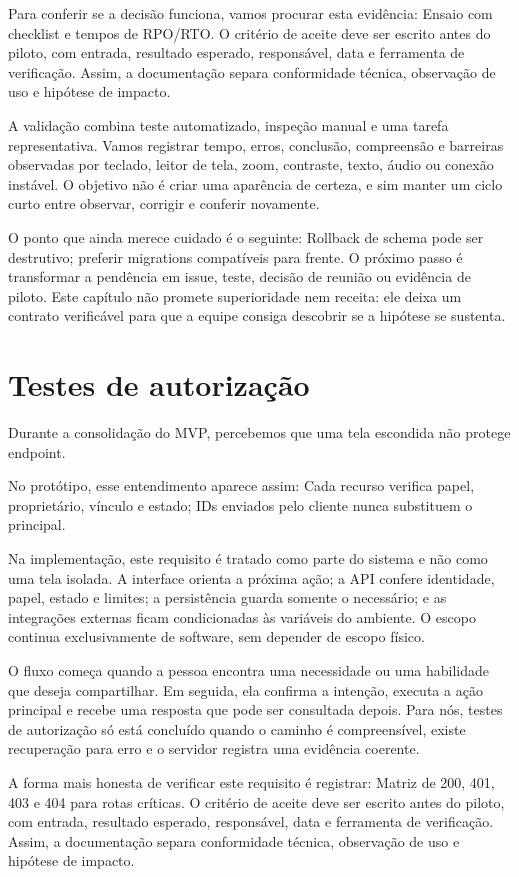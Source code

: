 \documentclass[12pt,oneside,a4paper,article]{abntex2}
\begin{document}
Para conferir se a decisão funciona, vamos procurar esta evidência: Ensaio com checklist e tempos de RPO/RTO. O critério de aceite deve ser escrito antes do piloto, com entrada, resultado esperado, responsável, data e ferramenta de verificação. Assim, a documentação separa conformidade técnica, observação de uso e hipótese de impacto.

A validação combina teste automatizado, inspeção manual e uma tarefa representativa. Vamos registrar tempo, erros, conclusão, compreensão e barreiras observadas por teclado, leitor de tela, zoom, contraste, texto, áudio ou conexão instável. O objetivo não é criar uma aparência de certeza, e sim manter um ciclo curto entre observar, corrigir e conferir novamente.

O ponto que ainda merece cuidado é o seguinte: Rollback de schema pode ser destrutivo; preferir migrations compatíveis para frente. O próximo passo é transformar a pendência em issue, teste, decisão de reunião ou evidência de piloto. Este capítulo não promete superioridade nem receita: ele deixa um contrato verificável para que a equipe consiga descobrir se a hipótese se sustenta.

\section{Testes de autorização}
Durante a consolidação do MVP, percebemos que uma tela escondida não protege endpoint.

No protótipo, esse entendimento aparece assim: Cada recurso verifica papel, proprietário, vínculo e estado; IDs enviados pelo cliente nunca substituem o principal.

Na implementação, este requisito é tratado como parte do sistema e não como uma tela isolada. A interface orienta a próxima ação; a API confere identidade, papel, estado e limites; a persistência guarda somente o necessário; e as integrações externas ficam condicionadas às variáveis do ambiente. O escopo continua exclusivamente de software, sem depender de escopo físico.

O fluxo começa quando a pessoa encontra uma necessidade ou uma habilidade que deseja compartilhar. Em seguida, ela confirma a intenção, executa a ação principal e recebe uma resposta que pode ser consultada depois. Para nós, testes de autorização só está concluído quando o caminho é compreensível, existe recuperação para erro e o servidor registra uma evidência coerente.

A forma mais honesta de verificar este requisito é registrar: Matriz de 200, 401, 403 e 404 para rotas críticas. O critério de aceite deve ser escrito antes do piloto, com entrada, resultado esperado, responsável, data e ferramenta de verificação. Assim, a documentação separa conformidade técnica, observação de uso e hipótese de impacto.
\end{document}
